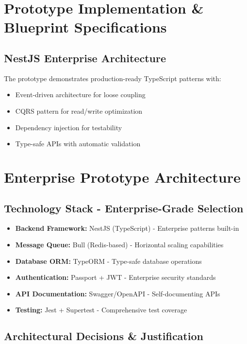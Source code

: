 \section{Prototype Implementation \& Blueprint Specifications}

\subsection{NestJS Enterprise Architecture}
The prototype demonstrates production-ready TypeScript patterns with:
\begin{itemize}
  \item Event-driven architecture for loose coupling
  \item CQRS pattern for read/write optimization
  \item Dependency injection for testability
  \item Type-safe APIs with automatic validation
\end{itemize}

\section{Enterprise Prototype Architecture}

\subsection{Technology Stack - Enterprise-Grade Selection}
\begin{itemize}
  \item \textbf{Backend Framework:} NestJS (TypeScript) - Enterprise patterns built-in
  \item \textbf{Message Queue:} Bull (Redis-based) - Horizontal scaling capabilities  
  \item \textbf{Database ORM:} TypeORM - Type-safe database operations
  \item \textbf{Authentication:} Passport + JWT - Enterprise security standards
  \item \textbf{API Documentation:} Swagger/OpenAPI - Self-documenting APIs
  \item \textbf{Testing:} Jest + Supertest - Comprehensive test coverage
\end{itemize}

\subsection{Architectural Decisions \& Justification}
